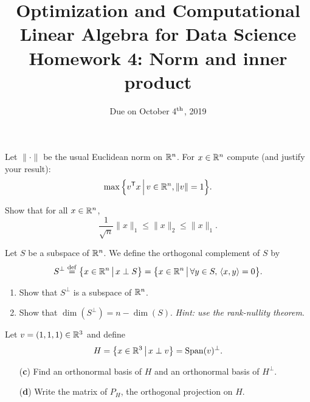 \documentclass[11pt,nocut]{article}
\title{\vspace{-3.0cm}%
	Optimization and Computational Linear Algebra for Data Science\\
Homework 4: Norm and inner product}
\date{\vspace{-1cm}Due on October 4$^{\rm th}$, 2019}
\begin{document}
\maketitle




\begin{problem}[2 points]
	Let $\| \cdot \|$ be the usual Euclidean norm on $\mathbb{R}^n$.
	For $x \in \mathbb{R}^n$ compute (and justify your result):
	$$
	\max \Big\{ v^{{\sf T}} x \, \Big| \, v \in \mathbb{R}^n, \|v\|=1 \Big\}.
$$
\end{problem}

\vspace{1mm} 

\begin{problem}[1 points]
	Show that for all $x \in \mathbb{R}^n$,
	$$
	\frac{1}{\sqrt{n}} \|x\|_1 \leq \|x\|_2 \leq \|x\|_1.
	$$
\end{problem}

\vspace{1mm}



\begin{problem}[3 points]
	Let $S$ be a subspace of $\mathbb{R}^n$. We define the orthogonal complement of $S$ by
	$$
	S^{\perp} \overset{\rm def}{=} 
	\big\{ x \in \mathbb{R}^n \, \big| \, x \perp S \big\} = 
	\big\{ x \in \mathbb{R}^n \, \big| \, \forall y \in S, \, \langle x,y \rangle = 0 \big\}.
	$$
	\begin{enumerate}[label=\normalfont(\textbf{\alph*})]
		\item Show that $S^{\perp}$ is a subspace of $\mathbb{R}^n$.
		\item Show that $\dim(S^{\perp}) = n - \dim(S)$. \textit{Hint: use the rank-nullity theorem}.
	\end{enumerate}
	Let $v = (1,1,1) \in \mathbb{R}^3$ and define
	$$
	H = 
	\big\{ x \in \mathbb{R}^3 \, \big| \, x \perp v \big\} = {{\rm Span}}(v)^{\perp}.
	$$
	\begin{enumerate}[label=\normalfont(\textbf{\alph*})]
		\item[\normalfont(\textbf{c})] Find an orthonormal basis of $H$ and an orthonormal basis of $H^{\perp}$.
		\item[\normalfont(\textbf{d})] Write the matrix of $P_H$, the orthogonal projection on $H$.
	\end{enumerate}
\end{problem}

\vspace{1mm}
\end{document}
